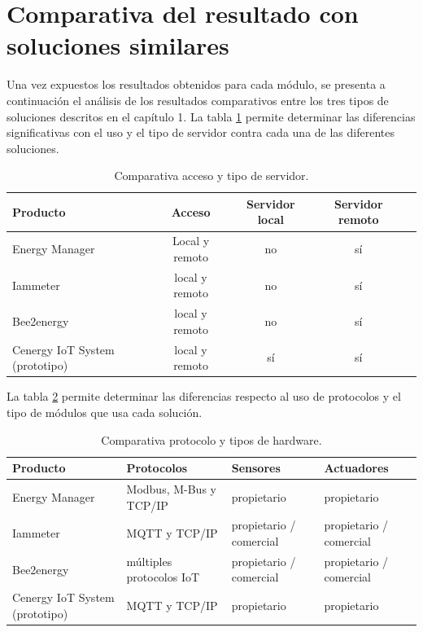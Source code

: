 \section{Comparativa del resultado con soluciones similares}

Una vez expuestos los resultados obtenidos para cada módulo, se presenta a continuación el análisis de los resultados comparativos entre los tres tipos de soluciones descritos en el capítulo 1. La tabla \ref{tab:tabla-resultado} permite determinar las diferencias significativas con el uso y el tipo de servidor contra cada una de las diferentes soluciones.

\begin{table}[h]
	\centering
	\caption[Comparativa de soluciones entre acceso y servidor]{Comparativa acceso y tipo de servidor.}
	\begin{tabular}{p{4cm} c c c c }    
		\toprule
		\textbf{Producto} & \textbf{Acceso} & \textbf{Servidor local}   & \textbf{Servidor remoto} \\
		\midrule
		Energy Manager & Local y remoto  & no & sí  \\		
		Iammeter	 & local y remoto & no & sí  \\
		Bee2energy	 & local y remoto	& no & sí  \\
		\rowcolor[HTML]{ebedef}Cenergy IoT System (prototipo) & local y remoto & sí & sí \\
		\bottomrule
		\hline
	\end{tabular}
	\label{tab:tabla-resultado}
\end{table}


La tabla \ref{tab:tabla-resultado2} permite determinar las diferencias respecto al uso de protocolos y el tipo de módulos que usa cada solución. 


\begin{table}[h]
	\centering
	\caption[Comparativa de soluciones entre protocolo y hardware]{Comparativa protocolo y tipos de hardware.}
	\begin{tabular}{p{3cm} p{3cm} p{2cm} p{2cm}}    
		\toprule
		\textbf{Producto} 	 & \textbf{Protocolos}  & \textbf{Sensores} & \textbf{Actuadores}  \\
		\midrule
		Energy Manager & Modbus, M-Bus y TCP/IP & propietario & propietario \\		
		Iammeter	 & MQTT y TCP/IP	& propietario / comercial & propietario / comercial   \\
		Bee2energy	 & múltiples protocolos IoT		& propietario / comercial & propietario / comercial \\
		\rowcolor[HTML]{ebedef}Cenergy IoT	System (prototipo) & MQTT y TCP/IP	& propietario & propietario  \\
		\bottomrule
		\hline
	\end{tabular}
	\label{tab:tabla-resultado2}
\end{table}
